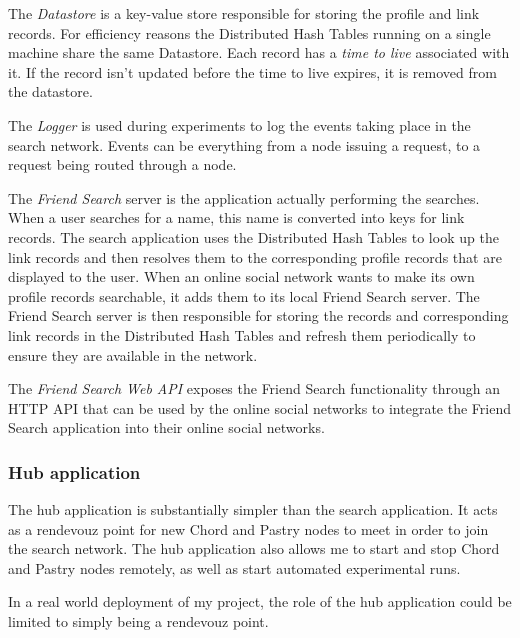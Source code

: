The \emph{Datastore} is a key-value store responsible for storing the profile and link records. For efficiency reasons the Distributed Hash Tables running on a single machine share the same Datastore. Each record has a \emph{time to live} associated with it. If the record isn't updated before the time to live expires, it is removed from the datastore.

The \emph{Logger} is used during experiments to log the events taking place in the search network. Events can be everything from a node issuing a request, to a request being routed through a node.

The \emph{Friend Search} server is the application actually performing the searches. When a user searches for a name, this name is converted into keys for link records. The search application uses the Distributed Hash Tables to look up the link records and then resolves them to the corresponding profile records that are displayed to the user.
When an online social network wants to make its own profile records searchable, it adds them to its local Friend Search server. The Friend Search server is then responsible for storing the records and corresponding link records in the Distributed Hash Tables and refresh them periodically to ensure they are available in the network.

The \emph{Friend Search Web API} exposes the Friend Search functionality through an HTTP API that can be used by the online social networks to integrate the Friend Search application into their online social networks.

\subsubsection{Hub application}
The hub application is substantially simpler than the search application. It acts as a rendevouz point for new Chord and Pastry nodes to meet in order to join the search network. The hub application also allows me to start and stop Chord and Pastry nodes remotely, as well as start automated experimental runs.

In a real world deployment of my project, the role of the hub application could be limited to simply being a rendevouz point.

